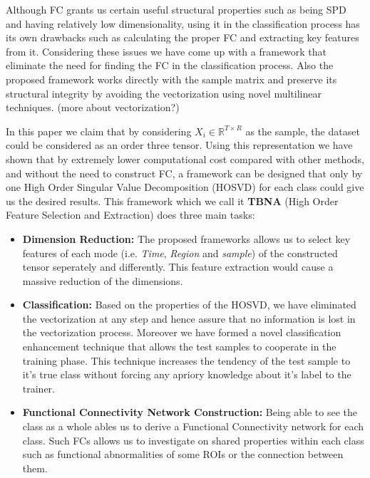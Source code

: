 \documentclass[journal]{IEEEtran}
\begin{document}
	Although FC grants us certain useful structural properties such as being SPD and having relatively low dimensionality, using  it in the classification process has its own drawbacks such as calculating the proper FC and extracting key features from it. Considering these issues we have come up with a framework that eliminate the need for finding the FC in the classification process. Also the proposed framework works directly with the sample matrix and preserve its structural integrity by avoiding the vectorization using novel multilinear techniques.    
	(more about vectorization?)
	
	In this paper we claim that by considering $X_i \in \mathbb{R}^ {T \times R}$ as the sample, the dataset could be considered as an order three tensor. Using this representation we have shown that by extremely lower computational cost compared with other methods, and without the need to construct FC, a framework can be designed that only by one High Order Singular Value Decomposition (HOSVD) for each class could give us the desired results. This framework which we call it \textbf{TBNA} (High Order Feature Selection and Extraction) does three main tasks: 
	\begin{itemize}
		\item
		\textbf{Dimension Reduction:}
		The proposed frameworks allows us to select key features of each mode  (i.e. \textit{Time}, \textit{Region} and \textit{sample}) of the constructed tensor seperately and differently. This feature extraction would cause a massive reduction of the dimensions.
		
		\item
		\textbf{Classification:} 
		Based on the properties of the HOSVD, we have eliminated the vectorization at any step and hence assure that no information is lost in the vectorization process. Moreover we have formed a novel  classification enhancement technique that allows the test samples to cooperate in the training phase. This technique increases the tendency of the test sample to it's true class without forcing any apriory knowledge about it's label to the trainer. 
		
		\item
		\textbf{Functional Connectivity Network Construction:}
		Being able to see the class as a whole ables us to derive a Functional Connectivity network for each class. Such FCs allows us to investigate on shared properties within each class such as functional abnormalities of some ROIs or the connection between them.  
		
	\end{itemize}
	
\end{document}
